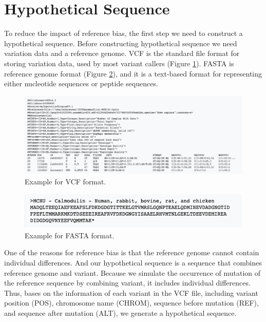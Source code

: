 \section{Hypothetical Sequence}
To reduce the impact of reference bias, the first step we need to construct a hypothetical sequence. Before constructing hypothetical sequence we need variation data and a reference genome. VCF is the standard file format for storing variation data, used by most variant callers (Figure \ref{VCF-format}). FASTA is reference genome format (Figure \ref{FASTA-format}), and it is a text-based format for representing either nucleotide sequences or peptide sequences.

\begin{figure}[H]
\includegraphics[width=1\columnwidth]{body/image/VCF-format.png}
\caption[VCF format]{Example for VCF format.}
\label{VCF-format}
\end{figure}

\begin{figure}[H]
\includegraphics[width=1\columnwidth]{body/image/FASTA-format.png}
\caption[FASTA format]{Example for FASTA format.}
\label{FASTA-format}
\end{figure}

One of the reasons for reference bias is that the reference genome cannot contain individual differences. And our hypothetical sequence is a sequence that combines reference genome and variant. Because we simulate the occurrence of mutation of the reference sequence by combining variant, it includes individual differences. Thus, bases on the information of each variant in the VCF file, including variant position (POS), chromosome name (CHROM), sequence before mutation (REF), and sequence after mutation (ALT), we generate a hypothetical sequence. 

